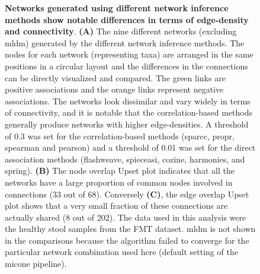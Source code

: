 \documentclass[letterpaper,12pt]{article}
\begin{document}
  \begin{figure}[H]
    \centering
    \caption{
      \textbf{Networks generated using different network inference methods show notable differences in terms of edge-density and connectivity}.
      \textbf{(A)} The nine different networks (excluding \acs{mldm}) generated by the different network inference methods.
      The nodes for each network (representing taxa) are arranged in the same positions in a circular layout and the differences in the connections can be directly visualized and compared.
      The green links are positive associations and the orange links represent negative associations.
      The networks look dissimilar and vary widely in terms of connectivity, and it is notable that the correlation-based methods generally produce networks with higher edge-densities.
      A threshold of 0.3 was set for the correlation-based methods (sparcc, propr, spearman and pearson) and a threshold of 0.01 was set for the direct association methods (flashweave, spieceasi, cozine, harmonies, and spring).
      \textbf{(B)} The node overlap Upset plot indicates that all the networks have a large proportion of common nodes involved in connections (33 out of 68).
      Conversely \textbf{(C)}, the edge overlap Upset plot shows that a very small fraction of these connections are actually shared (8 out of 202).
      The data used in this analysis were the healthy stool samples from the FMT dataset.
      \acs{mldm} is not shown in the comparisons because the algorithm failed to converge for the particular network combination used here (default setting of the \ac{micone} pipeline).
    }
    \label{fig:figure4}
  \end{figure}
\end{document}
